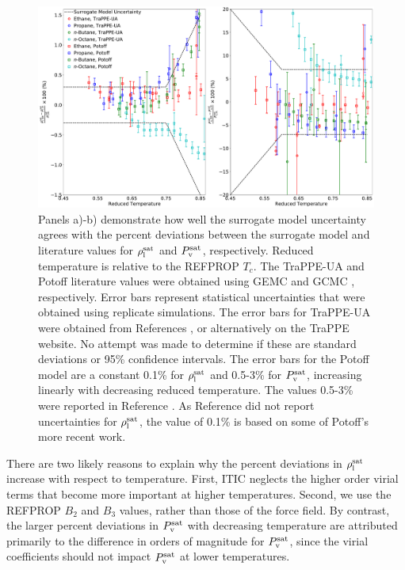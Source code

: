 \documentclass[journal=jctc,manuscript=article]{achemso}
\begin{document}
\begin{figure}[p!]
	\centering
	\includegraphics[width=6.4in]{ITIC_validation_error_model}
	\caption{Panels a)-b) demonstrate how well the surrogate model uncertainty agrees with the percent deviations between the surrogate model and literature values for $\rho_{\rm l}^{\rm sat}$ and $P_{\rm v}^{\rm sat}$, respectively. Reduced temperature is relative to the REFPROP $T_c$. The TraPPE-UA and Potoff literature values were obtained using GEMC \cite{TraPPE,Validation} and GCMC \cite{Mie}, respectively. Error bars represent statistical uncertainties that were obtained using replicate simulations. The error bars for TraPPE-UA were obtained from References , or alternatively on the TraPPE website. No attempt was made to determine if these are standard deviations or 95\% confidence intervals. The error bars for the Potoff model are a constant 0.1\% for $\rho_{\rm l}^{\rm sat}$ and 0.5-3\% for $P_{\rm v}^{\rm sat}$, increasing linearly with decreasing reduced temperature. The values 0.5-3\% were reported in Reference . As Reference  did not report uncertainties for $\rho_{\rm l}^{\rm sat}$, the value of 0.1\% is based on some of Potoff's more recent work. \cite{Potoff_branched}}
	\label{fig:ITIC_validation_error_model}
\end{figure} 

There are two likely reasons to explain why the percent deviations in $\rho_{\rm l}^{\rm sat}$ increase with respect to temperature. First, ITIC neglects the higher order virial terms that become more important at higher temperatures. Second, we use the REFPROP $B_2$ and $B_3$ values, rather than those of the force field. By contrast, the larger percent deviations in $P_{\rm v}^{\rm sat}$ with decreasing temperature are attributed primarily to the difference in orders of magnitude for $P_{\rm v}^{\rm sat}$, since the virial coefficients should not impact $P_{\rm v}^{\rm sat}$ at lower temperatures.  
\end{document}
